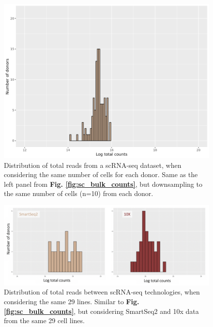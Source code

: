 \begin{figure}[h]
    \centering
    \includegraphics[width=12cm]{Appendix2/Fig/suppl_distribution_fixed_ncells.png}
    \caption[Distribution of total reads scRNA-seq same number of cells per donor]{Distribution of total reads from a scRNA-seq dataset, when considering the same number of cells for each donor.
    Same as the left panel from \textbf{Fig. \ref{fig:sc_bulk_counts}}, but downsampling to the same number of cells (n=10) from each donor.}
    \label{suppl_fig:counts_sc_ncells}
\end{figure}

\begin{figure}[h]
    \centering
    \includegraphics[width=15cm]{Appendix2/Fig/suppl_distribution_10x_ss2.png}
    \caption[Distribution of total reads between scRNA-seq technologies]{Distribution of total reads between scRNA-seq technologies, when considering the same 29 lines.
    Similar to \textbf{Fig. \ref{fig:sc_bulk_counts}}, but considering SmartSeq2 and 10x data from the same 29 cell lines.}
    \label{suppl_fig:counts_sc_technologies}
\end{figure}

